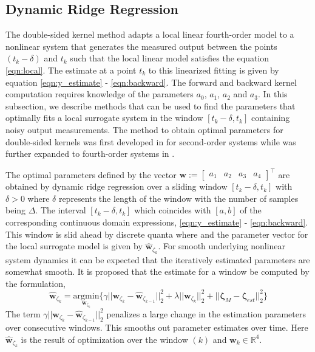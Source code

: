 \documentclass[letterpaper%
, twoside%
, 12pt%
,memoire%
, english%
,creativecommons,hyperref%
]{thETS}
\begin{document}
\subsection{Dynamic Ridge Regression} \label{Sec:ridge}
The double-sided kernel method adapts a local linear fourth-order model to a nonlinear system that generates the measured output between the points $(t_k-\delta)$ and $t_k$ such that the local linear model satisfies the equation \eqref{eqn:local}. The estimate at a point $t_k$ to this linearized fitting is given by equation \eqref{eqn:y_estimate} - \eqref{eqn:backward}. The forward and backward kernel computation requires knowledge of the parameters $a_0$, $a_1$, $a_2$ and $a_3$. In this subsection, we describe methods that can be used to find the parameters that optimally fits a local surrogate system in the window $[t_k-\delta,t_k]$ containing noisy output measurements. The method to obtain optimal parameters for double-sided kernels was first developed in \citep{RN118} for second-order systems while was further expanded to fourth-order systems in \citep{RN83}.

The optimal parameters defined by the vector $\mathbf{w}:=\begin{bmatrix}a_1& a_2& a_3&a_4\end{bmatrix}^{\intercal}$ are obtained by dynamic ridge regression over a sliding window $[t_k-\delta,t_k]$ with $\delta>0$ where $\delta$ represents the length of the window with the number of samples being $\Delta$. The interval $[t_k-\delta,t_k]$ which coincides with $[a,b]$ of the corresponding continuous domain expressions, \eqref{eqn:y_estimate} - \eqref{eqn:backward}. This window is slid ahead by discrete quanta where and the parameter vector for the local surrogate model is given by $\hat{\mathbf{w}}_{\zeta_k}$. For smooth underlying nonlinear system dynamics it can be expected that the iteratively estimated parameters are somewhat smooth. It is proposed that the estimate for a window be computed by the formulation, 
\begin{equation}\label{eqn:paramdynamic}
\hat{\mathbf{w}}_{\zeta_k}=\underset{\mathbf{w}_{\zeta_k}}{\text{argmin}} 	\big\{\gamma||\mathbf{w}_{\zeta_k}-\mathbf{\hat{w}}_{\zeta_{k-1}}||^{2}_{2} + \lambda||\mathbf{w}_{\zeta_k}||^{2}_{2} + ||\mathbf{\zeta}_M-\mathbf{\zeta}_{est}||^{2}_{2}\big\}
\end{equation}
The term $\gamma||\mathbf{w}_{\zeta_k}-\mathbf{\hat{w}}_{\zeta_{k-1}}||^{2}_{2}$ penalizes a large change in the estimation parameters over consecutive windows. This smooths out parameter estimates over time. Here $\mathbf{\hat{w}}_{\zeta_k}$ is the result of optimization over the window $(k)$ and $\mathbf{w}_k\in \mathbb{R}^{4}$. 
\end{document}
